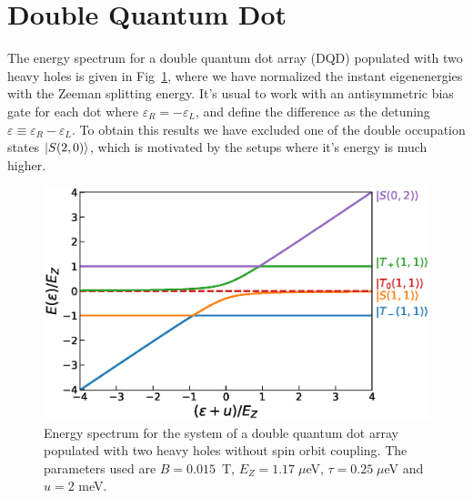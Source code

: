 \documentclass[a4paper,11pt]{article}
\begin{document}
\section{\label{sec:DQD}Double Quantum Dot}
The energy spectrum for a double quantum dot array (DQD) populated with two heavy holes is given in Fig~\ref{fig:eigenenergies_2QD_2HH_wo_SOC}, where we have normalized the instant eigenenergies with the Zeeman splitting energy. It's usual to work with an antisymmetric bias gate for each dot where $\varepsilon_R=-\varepsilon_L$, and define the difference as the detuning $\varepsilon\equiv \varepsilon_R-\varepsilon_L$. To obtain this results we have excluded one of the double occupation states $\ket{S(2,0)}$, which is motivated by the setups where it's energy is much higher.
\begin{figure}[!htbp]
	\centering
	\includegraphics[width=0.8\linewidth]{eigenenergies_2QD_2HH_wo_SOC.eps}
	\caption{Energy spectrum for the system of a double quantum dot array populated with two heavy holes without spin orbit coupling. The parameters used are $B=0.015$~T, $E_Z=1.17\; \mu$eV, $\tau=0.25\; \mu$eV and $u=2$ meV.}
	\label{fig:eigenenergies_2QD_2HH_wo_SOC}
\end{figure}
\end{document}
